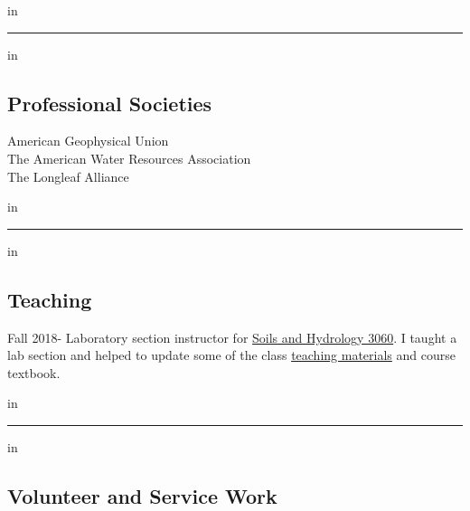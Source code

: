 \documentclass[10pt,letterpaper]{article}
\begin{document}
	 in
	
	\hrule
	\vspace{-0.4em}
	 in
	\subsection*{Professional Societies}
	
	American Geophysical Union \\
	The American Water Resources Association \\
	The Longleaf Alliance
	
	 in
	
	\hrule
	\vspace{-0.4em}
	 in
	\subsection*{Teaching}
	
	Fall 2018- Laboratory section instructor for \href{http://www.hydrology.uga.edu/rasmussen/class/3060/index.html}{Soils and Hydrology 3060}. I taught a lab section and helped to update some of the class \href{https://seyounger.github.io/soils_and_hydro_teaching/}{teaching materials} and course textbook.
	
	 in
	
	\hrule
	\vspace{-0.4em}
	 in
	\subsection*{Volunteer and Service Work}
	
\end{document}
